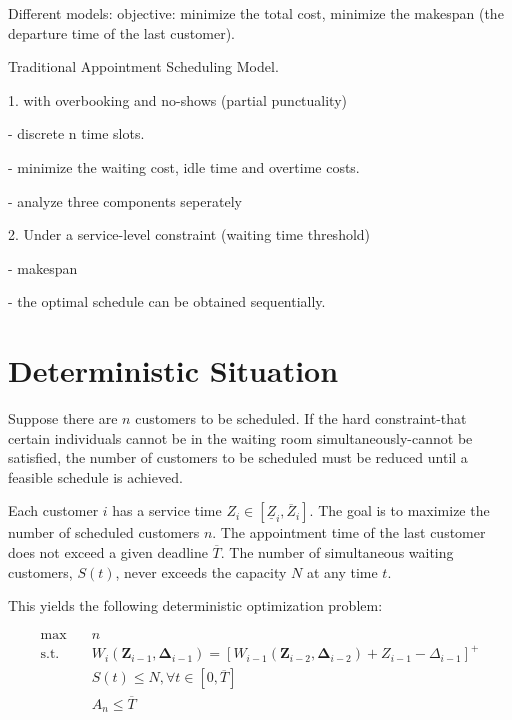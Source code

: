\documentclass{article}
\newcommand{\Z}{\mathbf{Z}}
\newcommand{\D}{\bm{\Delta}}
\begin{document}
Different models: objective: minimize the total cost, minimize the makespan (the departure time of the last customer).


Traditional Appointment Scheduling Model.

1. with overbooking and no-shows (partial punctuality)

- discrete n time slots.

- minimize the waiting cost, idle time and overtime costs.

- analyze three components seperately


2. Under a service-level constraint (waiting time threshold)

- makespan

- the optimal schedule can be obtained sequentially.


\section{Deterministic Situation}


Suppose there are $n$ customers to be scheduled. If the hard constraint-that certain individuals cannot be in the waiting room simultaneously-cannot be satisfied, the number of customers to be scheduled must be reduced until a feasible schedule is achieved.

Each customer $i$ has a service time $Z_{i} \in [\underline{Z}_{i}, \overline{Z}_{i}]$. The goal is to maximize the number of scheduled customers $n$. The appointment time of the last customer does not exceed a given deadline $\overline{T}$. The number of simultaneous waiting customers, $S(t)$, never exceeds the capacity $N$ at any time $t$.

This yields the following deterministic optimization problem:

\begin{equation}\label{deterministic_model}
    \begin{aligned}
        \max \quad & n \\
        \mbox{s.t.} \quad & W_{i}(\Z_{i-1}, \D_{i-1}) = [W_{i-1}(\Z_{i-2}, \D_{i-2}) + Z_{i-1} - \Delta_{i-1}]^{+}  \\
        & S(t) \leq N, \forall t  \in [0, \overline{T}] \\
        & A_{n} \leq \overline{T}
    \end{aligned}
\end{equation}
\end{document}

